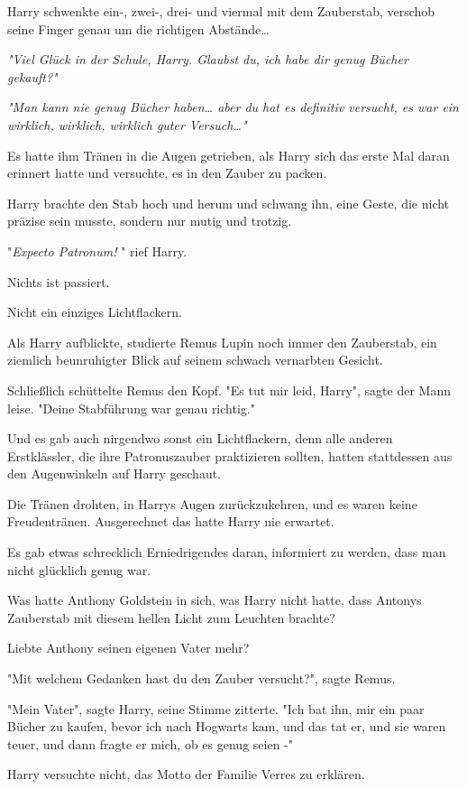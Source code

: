{Harry schwenkte ein-, zwei-, drei- und viermal mit dem Zauberstab, verschob seine Finger genau um die richtigen Abstände…

\emph{"Viel Glück in der Schule, Harry. Glaubst du, ich habe dir genug Bücher gekauft?"}

\emph{\emph{"Man kann nie genug Bücher haben… aber du hat es} \emph{definitiv} \emph{versucht, es war ein wirklich, wirklich, wirklich guter Versuch…"}}

Es hatte ihm Tränen in die Augen getrieben, als Harry sich das erste Mal daran erinnert hatte und versuchte, es in den Zauber zu packen.

Harry brachte den Stab hoch und herum und schwang ihn, eine Geste, die nicht präzise sein musste, sondern nur mutig und trotzig.

"\emph{Expecto Patronum!} " rief Harry.

Nichts ist passiert.

Nicht ein einziges Lichtflackern.

Als Harry aufblickte, studierte Remus Lupin noch immer den Zauberstab, ein ziemlich beunruhigter Blick auf seinem schwach vernarbten Gesicht.

Schließlich schüttelte Remus den Kopf. "Es tut mir leid, Harry", sagte der Mann leise. "Deine Stabführung war genau richtig."

Und es gab auch nirgendwo sonst ein Lichtflackern, denn alle anderen Erstklässler, die ihre Patronuszauber praktizieren sollten, hatten stattdessen aus den Augenwinkeln auf Harry geschaut.

Die Tränen drohten, in Harrys Augen zurückzukehren, und es waren keine Freudentränen. Ausgerechnet das hatte Harry nie erwartet.

Es gab etwas schrecklich Erniedrigendes daran, informiert zu werden, dass man nicht glücklich genug war.

Was hatte Anthony Goldstein in sich, was Harry nicht hatte, dass Antonys Zauberstab mit diesem hellen Licht zum Leuchten brachte?

Liebte Anthony seinen eigenen Vater mehr?

"Mit welchem Gedanken hast du den Zauber versucht?", sagte Remus.

"Mein Vater", sagte Harry, seine Stimme zitterte. "Ich bat ihn, mir ein paar Bücher zu kaufen, bevor ich nach Hogwarts kam, und das tat er, und sie waren teuer, und dann fragte er mich, ob es genug seien -"

Harry versuchte nicht, das Motto der Familie Verres zu erklären.

}
